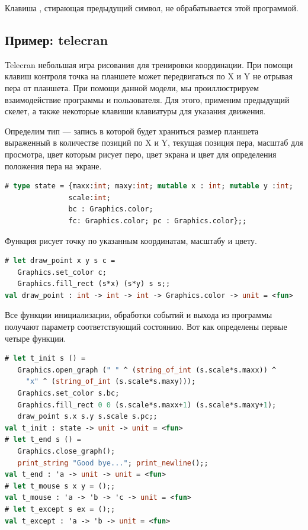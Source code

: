 Клавиша , стирающая предыдущий символ, не обрабатывается этой 
программой.

\subsection{Пример: telecran}
\label{subsec:example_telecran}

Telecran небольшая игра рисования для тренировки координации. При помощи клавиш 
контроля точка на планшете может передвигаться по X и Y не отрывая пера от 
планшета. При помощи данной модели, мы проиллюстрируем взаимодействие программы 
и пользователя. Для этого, применим предыдущий скелет, а также некоторые клавиши 
клавиатуры для указания движения.

Определим тип  --- запись в которой будет храниться размер планшета 
выраженный в количестве позиций по X и Y, текущая позиция пера, масштаб для 
просмотра, цвет которым рисует перо, цвет экрана и цвет для определения 
положения пера на экране.

\begin{lstlisting}[language=OCaml]
# type state = {maxx:int; maxy:int; mutable x : int; mutable y :int;
               scale:int;
               bc : Graphics.color;
               fc: Graphics.color; pc : Graphics.color};;
\end{lstlisting}

Функция  рисует точку по указанным координатам, масштабу и 
цвету.

\begin{lstlisting}[language=OCaml]
# let draw_point x y s c =
   Graphics.set_color c;
   Graphics.fill_rect (s*x) (s*y) s s;;
val draw_point : int -> int -> int -> Graphics.color -> unit = <fun>
\end{lstlisting}

Все функции инициализации, обработки событий и выхода из программы получают 
параметр соответствующий состоянию. Вот как определены первые четыре функции.

\begin{lstlisting}[language=OCaml]
# let t_init s () = 
   Graphics.open_graph (" " ^ (string_of_int (s.scale*s.maxx)) ^
     "x" ^ (string_of_int (s.scale*s.maxy)));
   Graphics.set_color s.bc;
   Graphics.fill_rect 0 0 (s.scale*s.maxx+1) (s.scale*s.maxy+1);
   draw_point s.x s.y s.scale s.pc;;
val t_init : state -> unit -> unit = <fun>
# let t_end s () = 
   Graphics.close_graph();
   print_string "Good bye..."; print_newline();;
val t_end : 'a -> unit -> unit = <fun>
# let t_mouse s x y = ();;
val t_mouse : 'a -> 'b -> 'c -> unit = <fun>
# let t_except s ex = ();;
val t_except : 'a -> 'b -> unit = <fun>
\end{lstlisting}

